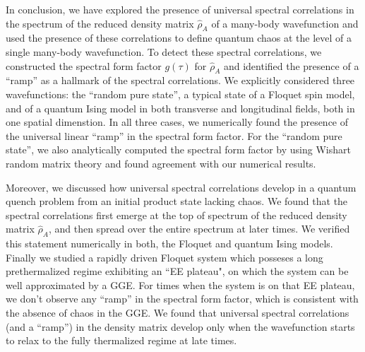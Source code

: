 \documentclass[aps,prb,preprint,onecolumn,amsmath,amssymb,superscriptaddress,eqsecnum,floatfix,scrartcl]{revtex4-1}
\begin{document}
In conclusion, we  have explored 
the presence of universal spectral correlations in
the spectrum of 
the reduced density matrix ${\hat \rho}_A$ of a many-body wavefunction and used 
the presence of these correlations to define quantum chaos at the level of 
a single many-body  wavefunction. To detect 
these spectral 
correlations,
we constructed the spectral form factor $g(\tau)$ for ${\hat \rho}_A$ and
identified the presence of 
a  ``ramp'' as a hallmark of 
the spectral
correlations.
We explicitly considered  three wavefunctions: the ``random pure state'', a  typical state 
of a  Floquet spin model, and 
of a quantum Ising model in both transverse and longitudinal fields, both in one spatial dimenstion.
 In all three cases, we numerically found the presence of the universal
linear   ``ramp'' in the spectral form factor.
For the ``random pure state'', we also analytically computed the spectral form factor by using Wishart random matrix theory and found
agreement  with  our numerical results. 

Moreover, we discussed  how
universal
spectral
correlations  develop  in a quantum quench problem from an initial product state lacking
chaos. We found  that
the spectral 
correlations
first 
emerge
at the top  of spectrum of the reduced density matrix  ${\hat \rho}_A$,
 and then spread over the entire spectrum at  later times. We verified this statement numerically in both,
the  Floquet and quantum Ising models. Finally we 
studied a rapidly  driven Floquet system 
which posseses  a  long prethermalized regime 
exhibiting  an ``EE plateau",
on which the system
can be well approximated by a GGE. 
For times when the system is on that EE  plateau, we
don't observe any ``ramp''
in the  spectral form factor,
which is consistent with the absence of chaos in the GGE. 
We found that 
universal
spectral  correlations (and a ``ramp'') 
 in the density matrix develop only when the wavefunction starts to relax to the fully thermalized regime at  late times.

\end{document}
